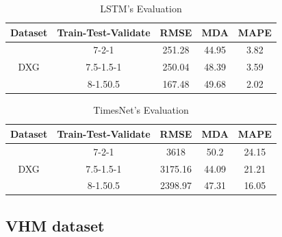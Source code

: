 \documentclass{ieeeojies}
\begin{document}
\begin{table}[H]
  \begin{tabular}{|c|c|c|c|c|}
  \hline
  \multicolumn{1}{|l|}{Dataset} & \multicolumn{1}{l|}{Train-Test-Validate} & \multicolumn{1}{l|}{RMSE} & \multicolumn{1}{l|}{MDA} & \multicolumn{1}{l|}{MAPE} \\ \hline
  \multirow{3}{*}{DXG}          & 7-2-1                                    & 251.28                    & 44.95                    & 3.82                      \\ \cline{2-5} 
                                & 7.5-1.5-1                                & 250.04                    & 48.39                    & 3.59                      \\ \cline{2-5} 
                                & 8-1.50.5                                 & 167.48                    & 49.68                    & 2.02                      \\ \hline
  \end{tabular}
  \caption{LSTM's Evaluation}
    \label{vcbresult}
  \end{table}

\begin{table}[H]
  \begin{tabular}{|c|c|c|c|c|}
  \hline
  \multicolumn{1}{|l|}{Dataset} & \multicolumn{1}{l|}{Train-Test-Validate} & \multicolumn{1}{l|}{RMSE} & \multicolumn{1}{l|}{MDA} & \multicolumn{1}{l|}{MAPE} \\ \hline
  \multirow{3}{*}{DXG}          & 7-2-1                                    & 3618                    & 50.2                    & 24.15                      \\ \cline{2-5} 
                                & 7.5-1.5-1                                & 3175.16                    & 44.09                    & 21.21                      \\ \cline{2-5} 
                                & 8-1.50.5                                 & 2398.97                    & 47.31                    & 16.05                      \\ \hline
  \end{tabular}
  \caption{TimesNet's Evaluation}
    \label{vcbresult}
  \end{table}

\subsection{VHM dataset} 
\end{document}
